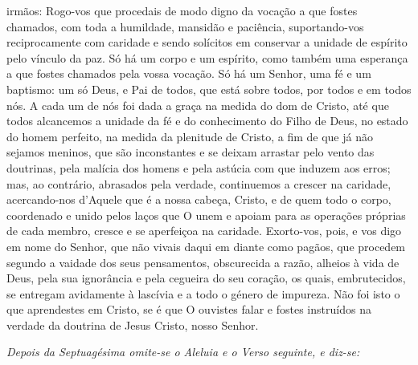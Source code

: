 \begin{paracol}{2}
{ irmãos: Rogo-vos que procedais de modo digno da vocação a que fostes chamados, com toda a humildade, mansidão e paciência, suportando-vos reciprocamente com caridade e sendo solícitos em conservar a unidade de espírito pelo vínculo da paz. Só há um corpo e um espírito, como também uma esperança a que fostes chamados pela vossa vocação. Só há um Senhor, uma fé e um baptismo: um só Deus, e Pai de todos, que está sobre todos, por todos e em todos nós. A cada um de nós foi dada a graça na medida do dom de Cristo, até que todos alcancemos a unidade da fé e do conhecimento do Filho de Deus, no estado do homem perfeito, na medida da plenitude de Cristo, a fim de que já não sejamos meninos, que são inconstantes e se deixam arrastar pelo vento das doutrinas, pela malícia dos homens e pela astúcia com que induzem aos erros; mas, ao contrário, abrasados pela verdade, continuemos a crescer na caridade, acercando-nos d’Aquele que é a nossa cabeça, Cristo, e de quem todo o corpo, coordenado e unido pelos laços que O unem e apoiam para as operações próprias de cada membro, cresce e se aperfeiçoa na caridade. Exorto-vos, pois, e vos digo em nome do Senhor, que não vivais daqui em diante como pagãos, que procedem segundo a vaidade dos seus pensamentos, obscurecida a razão, alheios à vida de Deus, pela sua ignorância e pela cegueira do seu coração, os quais, embrutecidos, se entregam avidamente à lascívia e a todo o género de impureza. Não foi isto o que aprendestes em Cristo, se é que O ouvistes falar e fostes instruídos na verdade da doutrina de Jesus Cristo, nosso Senhor.
}\end{paracol}

\begin{paracol}{2}\switchcolumn{}\switchcolumn*{}\switchcolumn{}\end{paracol}

\textit{Depois da Septuagésima omite-se o Aleluia e o Verso seguinte, e diz-se:}

